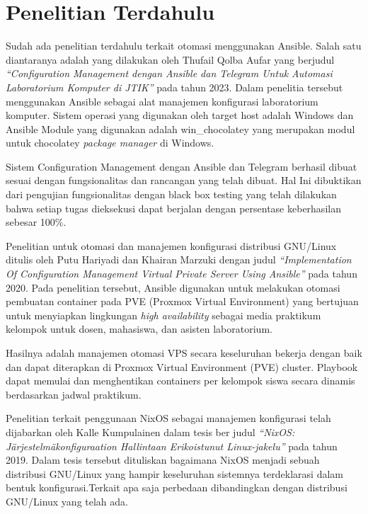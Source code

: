 \documentclass[10pt,]{report}
\begin{document}
\section{Penelitian Terdahulu}
\begin{adjustwidth}{0.70cm}{}
	\vspace{-3mm}
	\hspace\parindent
	Sudah ada penelitian terdahulu terkait otomasi menggunakan Ansible. Salah
	satu diantaranya adalah yang dilakukan oleh Thufail Qolba Aufar yang
	berjudul \textit{“Configuration Management dengan Ansible dan Telegram Untuk
		Automasi Laboratorium Komputer di JTIK”} pada tahun 2023. Dalam penelitia
	tersebut menggunakan Ansible sebagai alat manajemen konfigurasi
	laboratorium komputer. Sistem operasi yang digunakan oleh target host
	adalah Windows dan Ansible Module yang digunakan adalah win\_chocolatey yang
	merupakan modul untuk chocolatey \textit{package manager} di Windows.

	Sistem Configuration Management dengan Ansible dan Telegram berhasil dibuat
	sesuai dengan fungsionalitas dan rancangan yang telah dibuat. Hal Ini
	dibuktikan dari pengujian fungsionalitas dengan black box testing yang telah
	dilakukan bahwa setiap tugas dieksekusi dapat berjalan dengan persentase
	keberhasilan sebesar 100\%.

	Penelitian untuk otomasi dan manajemen konfigurasi distribusi GNU/Linux
	ditulis oleh Putu Hariyadi dan Khairan Marzuki dengan judul \textit{“Implementation
		Of Configuration Management Virtual Private Server Using Ansible”} pada
	tahun 2020. Pada penelitian tersebut, Ansible digunakan untuk melakukan
	otomasi pembuatan container pada PVE (Proxmox Virtual Environment) yang
	bertujuan untuk menyiapkan lingkungan \textit{high availability} sebagai media
	praktikum kelompok untuk dosen, mahasiswa, dan asisten laboratorium.

	Hasilnya adalah manajemen otomasi VPS secara keseluruhan bekerja dengan baik
	dan dapat diterapkan di Proxmox Virtual Environment (PVE) cluster. Playbook
	dapat memulai dan menghentikan containers per kelompok siswa secara dinamis
	berdasarkan jadwal praktikum.

	Penelitian terkait penggunaan NixOS sebagai manajemen konfigurasi telah
	dijabarkan oleh Kalle Kumpulainen dalam tesis ber judul \textit{“NixOS:
		Järjestelmäkonfiguraation Hallintaan Erikoistunut Linux-jakelu”} pada tahun
	2019. Dalam tesis tersebut dituliskan bagaimana NixOS menjadi sebuah
	distribusi GNU/Linux yang hampir keseluruhan sistemnya terdeklarasi dalam
	bentuk konfigurasi.Terkait apa saja perbedaan dibandingkan dengan
	distribusi GNU/Linux yang telah ada.


\end{adjustwidth}
\end{document}
